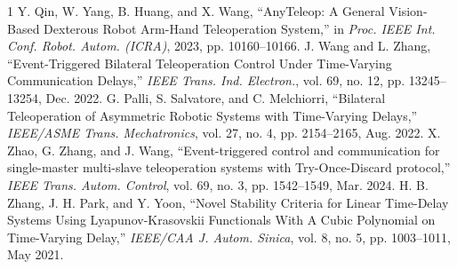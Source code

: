 \documentclass[letterpaper,journal]{IEEEtran}
\begin{document}
\begin{thebibliography}{1}
Y. Qin, W. Yang, B. Huang, and X. Wang, ``AnyTeleop: A General Vision-Based Dexterous Robot Arm-Hand Teleoperation System,'' in \textit{Proc. IEEE Int. Conf. Robot. Autom. (ICRA)}, 2023, pp. 10160--10166.
J. Wang and L. Zhang, ``Event-Triggered Bilateral Teleoperation Control Under Time-Varying Communication Delays,'' \textit{IEEE Trans. Ind. Electron.}, vol. 69, no. 12, pp. 13245--13254, Dec. 2022.
G. Palli, S. Salvatore, and C. Melchiorri, ``Bilateral Teleoperation of Asymmetric Robotic Systems with Time-Varying Delays,'' \textit{IEEE/ASME Trans. Mechatronics}, vol. 27, no. 4, pp. 2154--2165, Aug. 2022.
X. Zhao, G. Zhang, and J. Wang, ``Event-triggered control and communication for single-master multi-slave teleoperation systems with Try-Once-Discard protocol,'' \textit{IEEE Trans. Autom. Control}, vol. 69, no. 3, pp. 1542--1549, Mar. 2024.
H. B. Zhang, J. H. Park, and Y. Yoon, ``Novel Stability Criteria for Linear Time-Delay Systems Using Lyapunov-Krasovskii Functionals With A Cubic Polynomial on Time-Varying Delay,'' \textit{IEEE/CAA J. Autom. Sinica}, vol. 8, no. 5, pp. 1003--1011, May 2021.
\end{thebibliography}
\end{document}

